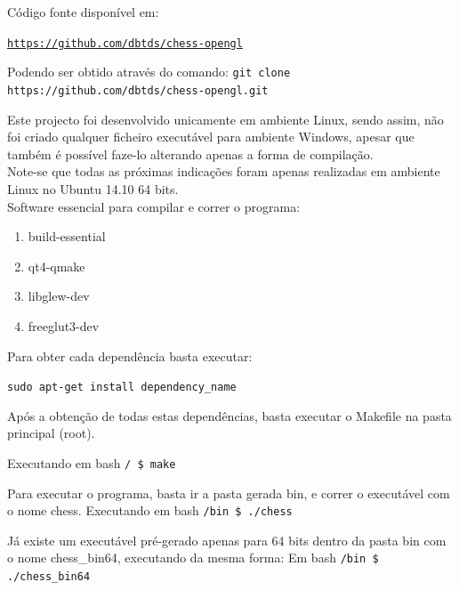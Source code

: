 \documentclass[portugues,final]{revdetua}
\begin{document}
Código fonte disponível em:

{\tt \url{https://github.com/dbtds/chess-opengl}}

Podendo ser obtido através do comando: {\tt git clone https://github.com/dbtds/chess-opengl.git}

Este projecto foi desenvolvido unicamente em ambiente Linux, sendo assim, não foi criado qualquer ficheiro executável para ambiente Windows, apesar que também é possível faze-lo alterando apenas a forma de compilação.\\

Note-se que todas as próximas indicações foram apenas realizadas em ambiente Linux no Ubuntu 14.10 64 bits.\\

Software essencial para compilar e correr o programa:
\begin{enumerate}
\item build-essential
\item qt4-qmake
\item libglew-dev
\item freeglut3-dev
\end{enumerate}

Para obter cada dependência basta executar:

{\tt sudo apt-get install dependency\_name}

Após a obtenção de todas estas dependências, basta executar o Makefile na pasta principal (root).

Executando em bash {\tt / \$ make}

Para executar o programa, basta ir a pasta gerada bin, e correr o executável com o nome chess.
Executando em bash {\tt /bin \$ ./chess}

Já existe um executável pré-gerado apenas para 64 bits dentro da pasta bin com o nome chess\_bin64, executando da mesma forma:
Em bash {\tt /bin \$ ./chess\_bin64}


\end{document}
